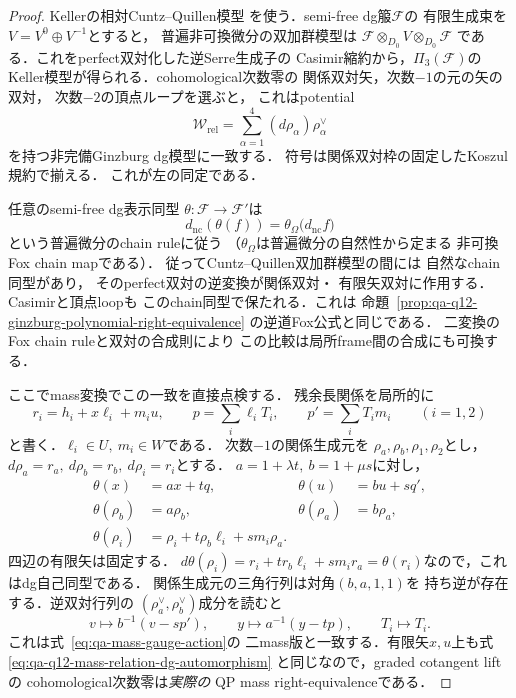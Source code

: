 \begin{proof}
Kellerの相対Cuntz--Quillen模型
\cite[Proposition~3.7, Proposition~6.6]{KellerDeformedCY2011}
を使う．semi-free dg箙$\mathscr F$の
有限生成束を$V=V^0\oplus V^{-1}$とすると，
普遍非可換微分の双加群模型は
$\mathscr F\otimes_{D_0}V\otimes_{D_0}\mathscr F$
である．これをperfect双対化した逆Serre生成子の
Casimir縮約から，$\Pi_3(\mathscr F)$の
Keller模型が得られる．cohomological次数零の
関係双対矢，次数$-1$の元の矢の双対，
次数$-2$の頂点ループを選ぶと，
これはpotential
\[
 \mathcal W_{\mathrm{rel}}
       =\sum_{\alpha=1}^4
                 (d\rho_\alpha)\rho_\alpha^\vee
\]
を持つ非完備Ginzburg dg模型に一致する．
符号は関係双対枠の固定したKoszul規約で揃える．
これが左の同定である．

任意のsemi-free dg表示同型
$\theta:\mathscr F\to\mathscr F'$は
\[
 d_{\mathrm{nc}}(\theta(f))
    =\theta_{\Omega}
       \bigl(d_{\mathrm{nc}}f\bigr)
\]
という普遍微分のchain ruleに従う
（$\theta_{\Omega}$は普遍微分の自然性から定まる
非可換Fox chain mapである）．
従ってCuntz--Quillen双加群模型の間には
自然なchain同型があり，
そのperfect双対の逆変換が関係双対・
有限矢双対に作用する．Casimirと頂点loopも
このchain同型で保たれる．これは
命題~\ref{prop:qa-q12-ginzburg-polynomial-right-equivalence}
の逆道Fox公式と同じである．
二変換のFox chain ruleと双対の合成則により
この比較は局所frame間の合成にも可換する．

ここでmass変換でこの一致を直接点検する．
残余長関係を局所的に
\[
 r_i=h_i+x\ell_i+m_i u,\qquad
 p=\sum_i\ell_iT_i,\qquad
 p'=\sum_iT_im_i\qquad(i=1,2)
 \tag{RM}\label{eq:qa-q12-long-relation-mass-coefficients}
\]
と書く．$\ell_i\in U,\ m_i\in W$である．
次数$-1$の関係生成元を
$\rho_a,\rho_b,\rho_1,\rho_2$とし，
$d\rho_a=r_a,\ d\rho_b=r_b,\ d\rho_i=r_i$とする．
$a=1+\lambda t,\ b=1+\mu s$に対し，
\[
 \begin{aligned}
 \theta(x)&=a x+tq,&
 \theta(u)&=b u+sq',\\
 \theta(\rho_b)&=a\rho_b,&
 \theta(\rho_a)&=b\rho_a,\\
 \theta(\rho_i)&=\rho_i
       +t\rho_b\ell_i+s m_i\rho_a.
 \end{aligned}
 \tag{MR}\label{eq:qa-q12-mass-relation-dg-automorphism}
\]
四辺の有限矢は固定する．
$d\theta(\rho_i)
 =r_i+t r_b\ell_i+s m_i r_a
 =\theta(r_i)$なので，これはdg自己同型である．
関係生成元の三角行列は対角$(b,a,1,1)$を
持ち逆が存在する．逆双対行列の
$(\rho_a^\vee,\rho_b^\vee)$成分を読むと
\[
 v\longmapsto b^{-1}(v-s p'),\qquad
 y\longmapsto a^{-1}(y-tp),\qquad
 T_i\longmapsto T_i .
 \tag{MD}\label{eq:qa-q12-mass-relation-cotangent-dual}
\]
これは式~\eqref{eq:qa-mass-gauge-action}の
二mass版と一致する．有限矢$x,u$上も式~
\eqref{eq:qa-q12-mass-relation-dg-automorphism}
と同じなので，graded cotangent liftの
cohomological次数零は\emph{実際の}
QP mass right-equivalenceである．


\end{proof}
